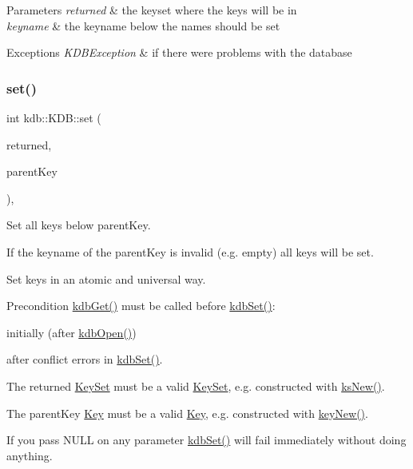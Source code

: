 \begin{DoxyParams}{Parameters}
{\em returned} & the keyset where the keys will be in \\
\hline
{\em keyname} & the keyname below the names should be set\\
\hline
\end{DoxyParams}

\begin{DoxyExceptions}{Exceptions}
{\em K\+D\+B\+Exception} & if there were problems with the database \\
\hline
\end{DoxyExceptions}
\mbox{\label{classkdb_1_1KDB_a62a4fafbe21d9519b31a7868aa05f3e3}} 
\subsubsection{\texorpdfstring{set()}{set()}\hspace{0.1cm}{\footnotesize\ttfamily [2/2]}}
{\footnotesize\ttfamily int kdb\+::\+K\+D\+B\+::set (\begin{DoxyParamCaption}\item[{\hyperlink{classkdb_1_1KeySet}{Key\+Set} \&}]{returned,  }\item[{\hyperlink{classkdb_1_1Key}{Key} \&}]{parent\+Key }\end{DoxyParamCaption})\hspace{0.3cm}{\ttfamily [inline]}, {\ttfamily [virtual]}}



Set all keys below parent\+Key. 

If the keyname of the parent\+Key is invalid (e.\+g. empty) all keys will be set.

Set keys in an atomic and universal way. \begin{DoxyPrecond}{Precondition}
\hyperlink{group__kdb_ga28e385fd9cb7ccfe0b2f1ed2f62453a1}{kdb\+Get()} must be called before \hyperlink{group__kdb_ga11436b058408f83d303ca5e996832bcf}{kdb\+Set()}\+:
\begin{DoxyItemize}
\item initially (after \hyperlink{group__kdb_ga6808defe5870f328dd17910aacbdc6ca}{kdb\+Open()})
\item after conflict errors in \hyperlink{group__kdb_ga11436b058408f83d303ca5e996832bcf}{kdb\+Set()}.
\end{DoxyItemize}

The {\ttfamily returned} \hyperlink{classkdb_1_1KeySet}{Key\+Set} must be a valid \hyperlink{classkdb_1_1KeySet}{Key\+Set}, e.\+g. constructed with \hyperlink{group__keyset_ga671e1aaee3ae9dc13b4834a4ddbd2c3c}{ks\+New()}.

The {\ttfamily parent\+Key} \hyperlink{classkdb_1_1Key}{Key} must be a valid \hyperlink{classkdb_1_1Key}{Key}, e.\+g. constructed with \hyperlink{group__key_gad23c65b44bf48d773759e1f9a4d43b89}{key\+New()}.
\end{DoxyPrecond}
If you pass N\+U\+LL on any parameter \hyperlink{group__kdb_ga11436b058408f83d303ca5e996832bcf}{kdb\+Set()} will fail immediately without doing anything.

